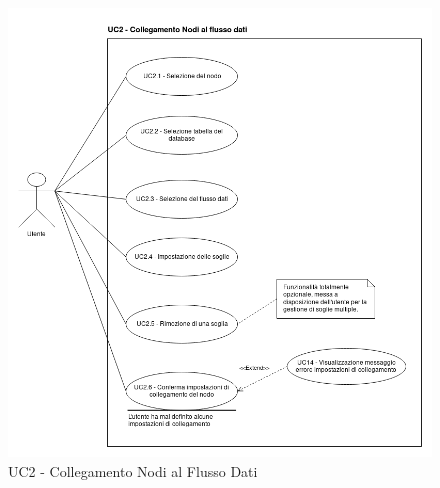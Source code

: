 \begin{figure}[H]
\centering
\includegraphics[scale=0.5]{./images/UC2.png}
\caption{UC2 - Collegamento Nodi al Flusso Dati}
\end{figure}

